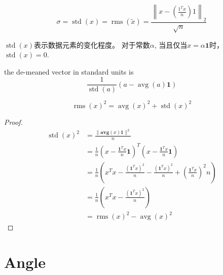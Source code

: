 \begin{definition}[$x$的标准差]
    \begin{equation}\sigma= \operatorname{std}(x)=\operatorname{rms}(\tilde{x})=\frac{\left\|x-\left( \frac{1^{T} x}{n} \right) 1\right\|_{2}}{\sqrt{n}} \end{equation}
\end{definition}

$\operatorname{std}(x)$表示数据元素的变化程度。 对于常数$\alpha$, 当且仅当$ x=\alpha \mathbf{1} $时， $ \operatorname{std}(x)=0 $.

\begin{corollary}
    the de-meaned vector in standard units is
\begin{equation}
\frac{1}{\operatorname{std}(a)}(a-\operatorname{avg}(a) \mathbf{1})
\end{equation}
\end{corollary}

\begin{theorem}
    \begin{equation} \operatorname{rms}(x)^{2}=\operatorname{avg}(x)^{2}+\operatorname{std}(x)^{2} \end{equation}
\end{theorem}

\begin{proof}
    \begin{equation}\displaystyle \begin{aligned}
        \operatorname{std} (x)^{2} & =\frac{\| \mathbf{avg} (x)\mathbf{1} \| ^{2}}{n}\\
         & =\frac{1}{n}\left( x-\frac{\mathbf{1}^{T} x}{n}\mathbf{1}\right)^{T}\left( x-\frac{\mathbf{1}^{T} x}{n}\mathbf{1}\right)\\
         & =\frac{1}{n}\left( x^{T} x-\frac{\left(\mathbf{1}^{T} x\right)^{2}}{n} -\frac{\left(\mathbf{1}^{T} x\right)^{2}}{n} +\left(\frac{\mathbf{1}^{T} x}{n}\right)^{2} n\right)\\
         & =\frac{1}{n}\left( x^{T} x-\frac{\left(\mathbf{1}^{T} x\right)^{2}}{n}\right)\\
         & =\operatorname{rms} (x)^{2} -\operatorname{avg} (x)^{2}
        \end{aligned}\end{equation}
\end{proof}

\section{Angle}

